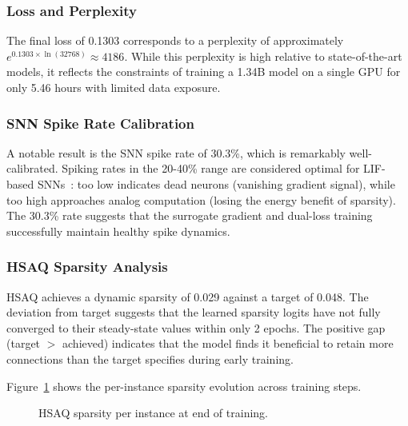 \documentclass[conference]{IEEEtran}
\begin{document}
\subsubsection{Loss and Perplexity}

The final loss of 0.1303 corresponds to a perplexity of approximately $e^{0.1303 \times \ln(32768)} \approx 4186$. While this perplexity is high relative to state-of-the-art models, it reflects the constraints of training a 1.34B model on a single GPU for only 5.46 hours with limited data exposure.

\subsubsection{SNN Spike Rate Calibration}

A notable result is the SNN spike rate of 30.3\%, which is remarkably well-calibrated. Spiking rates in the 20-40\% range are considered optimal for LIF-based SNNs~\cite{neftci2019surrogate}: too low indicates dead neurons (vanishing gradient signal), while too high approaches analog computation (losing the energy benefit of sparsity). The 30.3\% rate suggests that the surrogate gradient and dual-loss training successfully maintain healthy spike dynamics.

\subsubsection{HSAQ Sparsity Analysis}

HSAQ achieves a dynamic sparsity of 0.029 against a target of 0.048. The deviation from target suggests that the learned sparsity logits have not fully converged to their steady-state values within only 2 epochs. The positive gap (target $>$ achieved) indicates that the model finds it beneficial to retain more connections than the target specifies during early training.

Figure~\ref{fig:sparsity} shows the per-instance sparsity evolution across training steps.

\begin{figure}[h]
\centering
{}
\caption{HSAQ sparsity per instance at end of training.}
\label{fig:sparsity}
\end{figure}
\end{document}
